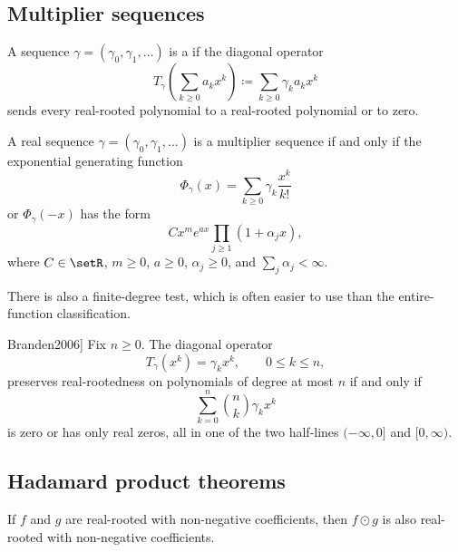 \subsection[multiplierSequences]{Multiplier sequences}

\begin{definition}
A sequence $\gamma=(\gamma_0,\gamma_1,\dotsc)$ is a
\label{multiplierSequenceDefinition}
if the diagonal operator
\[
  T_\gamma\!\left(\sum_{k\geq 0} a_k x^k\right)
  \coloneqq
  \sum_{k\geq 0} \gamma_k a_k x^k
\]
sends every real-rooted polynomial to a real-rooted polynomial or to zero.
\end{definition}

\begin{theorem}
A real sequence $\gamma=(\gamma_0,\gamma_1,\dotsc)$ is a multiplier
sequence if and only if the exponential generating function
\[
  \Phi_\gamma(x)=\sum_{k\geq 0}\gamma_k\frac{x^k}{k!}
\]
or $\Phi_\gamma(-x)$ has the form
\[
  Cx^m e^{ax}\prod_{j\geq 1}(1+\alpha_jx),
\]
where $C\in\setR$, $m\geq 0$, $a\geq 0$, $\alpha_j\geq 0$, and
$\sum_j\alpha_j<\infty$.
\end{theorem}

There is also a finite-degree test, which is often easier to use than the
entire-function classification.
\begin{theorem}[Finite multiplier-sequence criterion,
\cite[Thm.~3.14]{Branden2006}]
\label{finiteMultiplierSequenceCriterion}
Fix \(n\geq 0\).  The diagonal operator
\[
  T_\gamma(x^k)=\gamma_kx^k,
  \qquad 0\leq k\leq n,
\]
preserves real-rootedness on polynomials of degree at most \(n\) if and only if
\[
  \sum_{k=0}^n \binom{n}{k}\gamma_kx^k
\]
is zero or has only real zeros, all in one of the two half-lines
\((-\infty,0]\) and \([0,\infty)\).
\end{theorem}

\subsection[hadamardProductTheorems]{Hadamard product theorems}

\begin{theorem}
If $f$ and $g$ are real-rooted with non-negative coefficients,
then $f\odot g$ is also real-rooted with non-negative coefficients.
\end{theorem}

